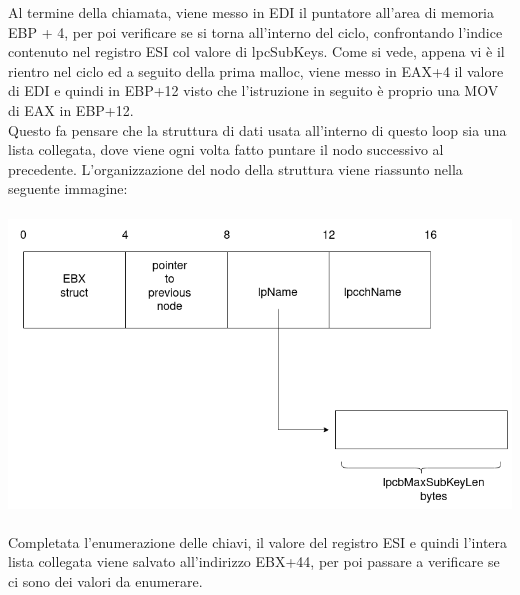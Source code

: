 \documentclass[12pt]{extarticle}
\begin{document}
Al termine della chiamata, viene messo in EDI il puntatore all'area di memoria EBP + 4, per poi verificare se si torna all'interno del ciclo, confrontando l'indice contenuto nel registro ESI col valore di \textsf{lpcSubKeys}. Come si vede, appena vi è il rientro nel ciclo ed a seguito della prima malloc, viene messo in EAX+4 il valore di EDI e quindi in EBP+12 visto che l'istruzione in seguito è proprio una MOV di EAX in EBP+12.\\ Questo fa pensare che la struttura di dati usata all'interno di questo loop sia una lista collegata, dove viene ogni volta fatto puntare il nodo successivo al precedente. L'organizzazione del nodo della struttura viene riassunto nella seguente immagine:\\\\
\includegraphics[scale=0.27]{immagini/struct_chiavi}
\\\\Completata l'enumerazione delle chiavi, il valore del registro ESI e quindi l'intera lista collegata viene salvato all'indirizzo EBX+44, per poi passare a verificare se ci sono dei valori da enumerare.
\end{document}
